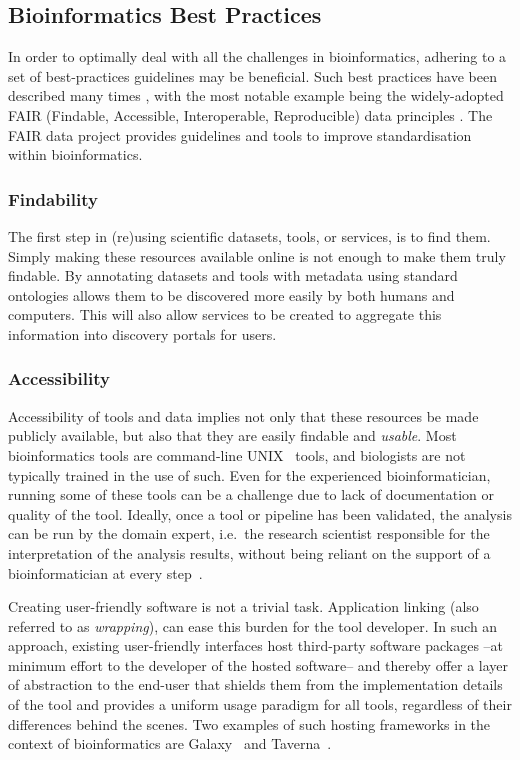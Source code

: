 \begin{justify}
\section{Bioinformatics Best Practices}

In order to optimally deal with all the challenges in bioinformatics, adhering to a set of best-practices guidelines may be beneficial. Such best practices have been described many times \cite{sandve2013ten,Seemann2013,wilson2014best,prlic2012ten,altschul2013anatomy,via2013best,Leprevost2014}, with the most notable example being the widely-adopted FAIR (Findable, Accessible, Interoperable, Reproducible) data principles \cite{wilkinson2016fair}. The FAIR data project provides guidelines and tools to improve standardisation within bioinformatics.

\subsubsection{Findability}
The first step in (re)using scientific datasets, tools, or services, is to find them. Simply making these resources available online is not enough to make them truly findable. By annotating datasets and tools with metadata using standard ontologies allows them to be discovered more easily by both humans and computers. This will also allow services to be created to aggregate this information into discovery portals for users.


\subsubsection{Accessibility}
Accessibility of tools and data implies not only that these resources be made publicly available, but also that they are easily findable and \emph{usable}. Most bioinformatics tools are command-line UNIX~\cite{url-unix} tools, and biologists are not typically trained in the use of such. Even for the experienced bioinformatician, running some of these tools can be a challenge due to lack of documentation or quality of the tool. Ideally, once a tool or pipeline has been validated, the analysis can be run by the domain expert, i.e.\ the research scientist responsible for the interpretation of the analysis results, without being reliant on the support of a bioinformatician at every step~\cite{kumar2007bioinformatics}.

Creating user-friendly software is not a trivial task. Application linking (also referred to as \emph{wrapping}), can ease this burden for the tool developer. In such an approach, existing user-friendly interfaces host third-party software packages --at minimum effort to the developer of the hosted software-- and thereby offer a layer of abstraction to the end-user that shields them from the implementation details of the tool and provides a uniform usage paradigm for all tools, regardless of their differences behind the scenes. Two examples of such hosting frameworks in the context of bioinformatics are Galaxy~\cite{giardine2005galaxy,goecks2010galaxy} and Taverna~\cite{oinn2004taverna}.


\end{justify}
